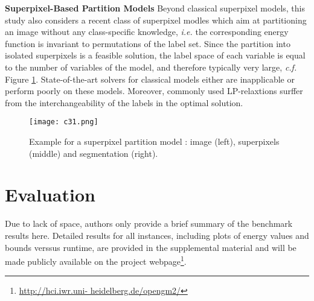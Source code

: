 \documentclass[10pt,twocolumn,letterpaper]{article}
\begin{document}
{\bf Superpixel-Based Partition Models} Beyond classical superpixel models, this study also considers a recent class of superpixel modles \cite{Higher,Probabilistic,segmentation,Globally} which aim at partitioning an image without any class-specific knowledge, \emph{i.e.} the corresponding energy function is invariant to permutations of the label set. Since the partition into isolated superpixels is a feasible solution, the label space of each variable is equal to the number of variables of the model, and therefore typically very large, \emph{c.f.} Figure \ref{fig1}. State-of-the-art solvers for classical models either are inapplicable or perform poorly on these models. Moreover, commonly used LP-relaxtions surffer from  the interchangeability of the labels in the optimal solution.

\begin{figure}[htbp]
\begin{center}
\texttt{[image: c31.png]}
\end{center}
\caption{Example for a superpixel partition model \cite{Probabilistic}: image (left), superpixels (middle) and segmentation (right).}
\label{fig1}
\end{figure}

\section{Evaluation}

Due to lack of space, authors only provide a brief summary of the benchmark results here. Detailed results for all instances, including plots of energy values and bounds verssus runtime, are provided in the supplemental material and will be made publicly available on the project webpage\footnote{\url{http://hci.iwr.uni- heidelberg.de/opengm2/}}.
\end{document}
